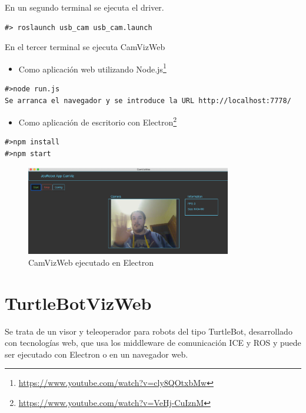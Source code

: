 En un segundo terminal se ejecuta el driver.

\begin{lstlisting}[caption= Ejecución del driver de ROS label=cod.driverusbcam]
#> roslaunch usb_cam usb_cam.launch
\end{lstlisting}

En el tercer terminal se ejecuta CamVizWeb

\begin{itemize}
\item 
Como aplicación web utilizando Node.js\footnote{\url{https://www.youtube.com/watch?v=cly8QOtxbMw}}
\end{itemize}

\begin{lstlisting}[caption= Ejecución con Node.js, label=cod.camviznodejs]
#>node run.js
Se arranca el navegador y se introduce la URL http://localhost:7778/
\end{lstlisting}

\begin{itemize}
\item 
Como aplicación de escritorio con Electron\footnote{\url{https://www.youtube.com/watch?v=VeHj-CuIznM}}
\end{itemize}

\begin{lstlisting}[caption= Ejecución con Electron, label=cod.camvizelectron]
#>npm install
#>npm start
\end{lstlisting}

\begin{figure}[H]
  \begin{center}
    \includegraphics[width=0.8\textwidth]{figures/camvizelectron.png}
    		\caption{CamVizWeb ejecutado en Electron}
		\label{fig.camvizelectron}
		\end{center}
\end{figure}

\section{TurtleBotVizWeb}
Se trata de un visor y teleoperador para robots del tipo TurtleBot, desarrollado con tecnologías web, que usa los middleware de comunicación ICE y ROS y puede ser ejecutado con Electron o en un navegador web.

